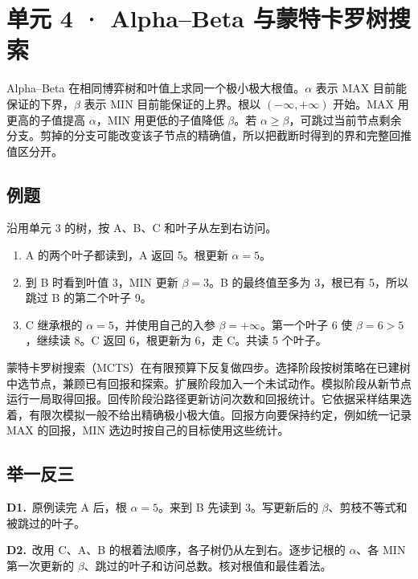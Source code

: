 \documentclass[UTF8,a4paper,11pt]{ctexart}
\newcommand{\PracticeQuestion}[3]{\par\Needspace{4\baselineskip}\noindent\begin{minipage}{\linewidth}\textbf{#1.}\ #2\par\noindent\rule{0pt}{#3mm}\par\end{minipage}\par}
\begin{document}
\section{单元 4 · Alpha–Beta 与蒙特卡罗树搜索}
Alpha–Beta 在相同博弈树和叶值上求同一个极小极大根值。$\alpha$ 表示 MAX 目前能保证的下界，$\beta$ 表示 MIN 目前能保证的上界。根以 $(-\infty,+\infty)$ 开始。MAX 用更高的子值提高 $\alpha$，MIN 用更低的子值降低 $\beta$。若 $\alpha\ge\beta$，可跳过当前节点剩余分支。剪掉的分支可能改变该子节点的精确值，所以把截断时得到的界和完整回推值区分开。

\subsection{例题}
沿用单元 3 的树，按 A、B、C 和叶子从左到右访问。

\begin{enumerate}
\item A 的两个叶子都读到，A 返回 5。根更新 $\alpha=5$。
\item 到 B 时看到叶值 3，MIN 更新 $\beta=3$。B 的最终值至多为 3，根已有 5，所以跳过 B 的第二个叶子 9。
\item C 继承根的 $\alpha=5$，并使用自己的入参 $\beta=+\infty$。第一个叶子 6 使 $\beta=6>5$，继续读 8。C 返回 6，根更新为 6，走 C。共读 5 个叶子。
\end{enumerate}
蒙特卡罗树搜索（MCTS）在有限预算下反复做四步。选择阶段按树策略在已建树中选节点，兼顾已有回报和探索。扩展阶段加入一个未试动作。模拟阶段从新节点运行一局取得回报。回传阶段沿路径更新访问次数和回报统计。它依据采样结果选着，有限次模拟一般不给出精确极小极大值。回报方向要保持约定，例如统一记录 MAX 的回报，MIN 选边时按自己的目标使用这些统计。

\subsection{举一反三}
\PracticeQuestion{D1}{原例读完 A 后，根 $\alpha=5$。来到 B 先读到 3。写更新后的 $\beta$、剪枝不等式和被跳过的叶子。}{32}
\PracticeQuestion{D2}{改用 C、A、B 的根着法顺序，各子树仍从左到右。逐步记根的 $\alpha$、各 MIN 第一次更新的 $\beta$、跳过的叶子和访问总数。核对根值和最佳着法。}{32}
\clearpage
\end{document}
